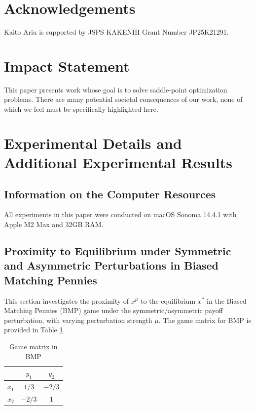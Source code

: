 \documentclass{article}
\theoremstyle{plain}
\begin{document}
\section*{Acknowledgements}
Kaito Ariu is supported by JSPS KAKENHI Grant Number JP25K21291.

\section*{Impact Statement}
This paper presents work whose goal is to solve saddle-point optimization problems.
There are many potential societal consequences of our work, none of which we feel must be specifically highlighted here.





\newpage
\appendix
\onecolumn
\section{Experimental Details and Additional Experimental Results}
\label{sec:appx_experimental_details}

\subsection{Information on the Computer Resources}
\label{sec:appx_computer_resources}
All experiments in this paper were conducted on macOS Sonoma 14.4.1 with Apple M2 Max and 32GB RAM.


\subsection{Proximity to Equilibrium under Symmetric and Asymmetric Perturbations in Biased Matching Pennies}
\label{sec:appx_symmetric_perturbation_vs_asymmetric_perturbation}
This section investigates the proximity of $x^{\mu}$ to the equilibrium $x^{\ast}$ in the Biased Matching Pennies (BMP) game under the symmetric/asymmetric payoff perturbation, with varying perturbation strength $\mu$.
The game matrix for BMP is provided in Table \ref{tab:biased-mp}.
\begin{table}[h!]
    \centering
    \caption{Game matrix in BMP}
    \label{tab:biased-mp}
    \begin{tabular}{ccc}
        \hline
        & $y_1$  & $y_2$  \\ \hline
        $x_1$ & $1/3$  & $-2/3$ \\
        $x_2$ & $-2/3$ & $1$    \\ \hline
    \end{tabular}
\end{table}
\end{document}

